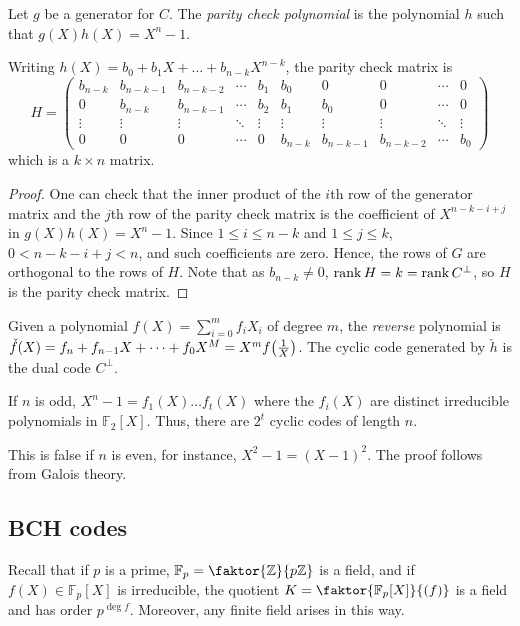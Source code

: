 \begin{definition}
    Let \( g \) be a generator for \( C \).
    The \emph{parity check polynomial} is the polynomial \( h \) such that \( g(X) h(X) = X^n - 1 \).
\end{definition}
\begin{corollary}
    Writing \( h(X) = b_0 + b_1 X + \dots + b_{n-k} X^{n-k} \), the parity check matrix is
    \[ H = \begin{pmatrix}
        b_{n-k} & b_{n-k-1} & b_{n-k-2} & \cdots & b_1 & b_0 & 0 & 0 & \cdots & 0 \\
        0 & b_{n-k} & b_{n-k-1} & \cdots & b_2 & b_1 & b_0 & 0 & \cdots & 0 \\
        \vdots & \vdots & \vdots & \ddots & \vdots & \vdots & \vdots & \vdots & \ddots & \vdots \\
        0 & 0 & 0 & \cdots & 0 & b_{n-k} & b_{n-k-1} & b_{n-k-2} & \cdots & b_0
    \end{pmatrix} \]
    which is a \( k \times n \) matrix.
\end{corollary}
\begin{proof}
    One can check that the inner product of the \( i \)th row of the generator matrix and the \( j \)th row of the parity check matrix is the coefficient of \( X^{n-k-i+j} \) in \( g(X) h(X) = X^n - 1 \).
    Since \( 1 \leq i \leq n - k \) and \( 1 \leq j \leq k \), \( 0 < n - k - i + j < n \), and such coefficients are zero.
    Hence, the rows of \( G \) are orthogonal to the rows of \( H \).
    Note that as \( b_{n-k} \neq 0 \), \( \rank H = k = \rank C^\perp \), so \( H \) is the parity check matrix.
\end{proof}
\begin{remark}
    Given a polynomial \( f(X) = \sum_{i=0}^m f_i X_i \) of degree \( m \), the \emph{reverse} polynomial is \( \check{f}(X) = f_n + f_{n-1}X + \dots + f_0 X^M = X^m f\qty(\frac{1}{X}) \).
    The cyclic code generated by \( \check{h} \) is the dual code \( C^\perp \).
\end{remark}
\begin{lemma}
    If \( n \) is odd, \( X^n - 1 = f_1(X) \dots f_t(X) \) where the \( f_i(X) \) are distinct irreducible polynomials in \( \mathbb F_2[X] \).
    Thus, there are \( 2^t \) cyclic codes of length \( n \).
\end{lemma}
This is false if \( n \) is even, for instance, \( X^2 - 1 = (X - 1)^2 \).
The proof follows from Galois theory.

\subsection{BCH codes}
Recall that if \( p \) is a prime, \( \mathbb F_p = \faktor{\mathbb Z}{p\mathbb Z} \) is a field, and if \( f(X) \in \mathbb F_p[X] \) is irreducible, the quotient \( K = \faktor{\mathbb F_p[X]}{(f)} \) is a field and has order \( p^{\deg f} \).
Moreover, any finite field arises in this way.

